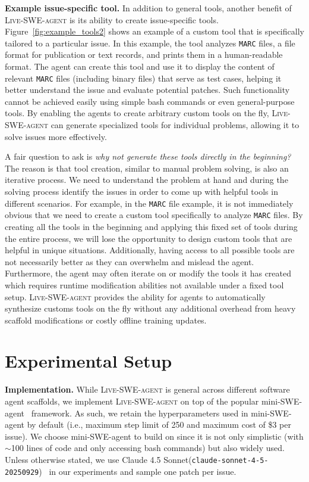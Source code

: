 \documentclass{article}
\newcommand{\tech}{\textsc{Live-SWE-agent}\xspace}
\newcommand{\minisweagent}{mini-SWE-agent\xspace}
\newcommand{\claudesonnetfourfive}{Claude 4.5 Sonnet\xspace}
\newcommand{\parabf}[1]{\vspace{.03in}\noindent \textbf{#1}}
\newcommand{\CodeIn}[1]{{\small \texttt{#1}}}
\begin{document}
\textbf{Example issue-specific tool.}
In addition to general tools, another benefit of \tech is its ability to create issue-specific tools.
Figure~\ref{fig:example_tools2} shows an example of a custom tool that is specifically tailored to a particular issue.
In this example, the tool analyzes \CodeIn{MARC} files, a file format for publication or text records, and prints them in a human-readable format. 
The agent can create this tool and use it to display the content of relevant \CodeIn{MARC} files (including binary files) that serve as test cases, helping it better understand the issue and evaluate potential patches.
Such functionality cannot be achieved easily using simple bash commands or even general-purpose tools.
By enabling the agents to create arbitrary custom tools on the fly, \tech can generate specialized tools for individual problems, allowing it to solve issues more effectively.



A fair question to ask is \textit{why not generate these tools directly in the beginning?} 
The reason is that tool creation, similar to manual problem solving, is also an iterative process.
We need to understand the problem at hand and during the solving process identify the issues in order to come up with helpful tools in different scenarios.
For example, in the \CodeIn{MARC} file example, it is not immediately obvious that we need to create a custom tool specifically to analyze \CodeIn{MARC} files.
By creating all the tools in the beginning and applying this fixed set of tools during the entire process, we will lose the opportunity to design custom tools that are helpful in unique situations.
Additionally, having access to all possible tools are not necessarily better as they can overwhelm and mislead the agent.
Furthermore, the agent may often iterate on or modify the tools it has created which requires runtime modification abilities not available under a fixed tool setup. 
\tech provides the ability for agents to automatically synthesize customs tools on the fly without any additional overhead from heavy scaffold modifications or costly offline training updates.


\section{Experimental Setup}
\label{sec:setup}

\parabf{Implementation.} 
While \tech is general across different software agent scaffolds, we implement \tech on top of the popular \minisweagent~\citep{yang2024sweagent} framework. 
As such, we retain the hyperparameters used in \minisweagent by default (i.e., maximum step limit of 250 and maximum cost of \$3 per issue).
We choose \minisweagent to build on since it is not only simplistic (with $\sim$100 lines of code and only accessing bash commands) but also widely used.
Unless otherwise stated, we use \claudesonnetfourfive (\CodeIn{claude-sonnet-4-5-20250929})~\citep{sonnet4.5} in our experiments and sample one patch per issue.
\end{document}
